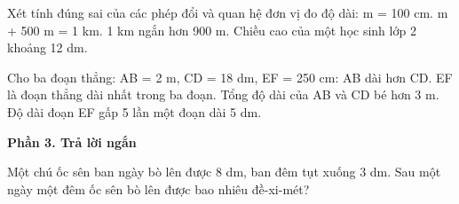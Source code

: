 \begin{ex} %
Xét tính đúng sai của các phép đổi và quan hệ đơn vị đo độ dài:
\choiceTF
{ m = 100 cm.}
{ m + 500 m = 1 km.}
{1 km ngắn hơn 900 m.}
{\True Chiều cao của một học sinh lớp 2 khoảng 12 dm.}
\end{ex}

\begin{ex} %
Cho ba đoạn thẳng: AB = 2 m, CD = 18 dm, EF = 250 cm:
\choiceTF
{\True AB dài hơn CD.}
{\True EF là đoạn thẳng dài nhất trong ba đoạn.}
{Tổng độ dài của AB và CD bé hơn 3 m.}
{\True Độ dài đoạn EF gấp 5 lần một đoạn dài 5 dm.}
\end{ex}

\textbf{Phần 3. Trả lời ngắn}

\begin{ex} %
Một chú ốc sên ban ngày bò lên được 8 dm, ban đêm tụt xuống 3 dm. Sau một ngày một đêm ốc sên bò lên được bao nhiêu đề-xi-mét?
\end{ex}

